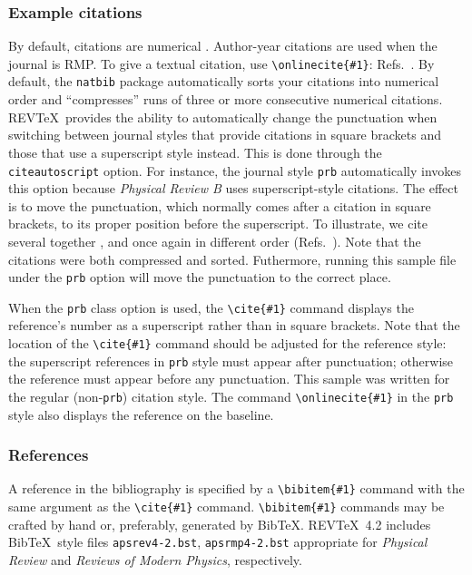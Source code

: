 \documentclass[%
 preprint, linenumbers,
 amsmath,amssymb,
 aps, physrev,
pra,
]{revtex4-2}
\begin{document}
\subsubsection{Example citations}
By default, citations are numerical \cite{Beutler1994}.
Author-year citations are used when the journal is RMP. 
To give a textual citation, use \verb+\onlinecite{#1}+: 
Refs.~. 
By default, the \texttt{natbib} package automatically sorts your citations into numerical order and ``compresses'' runs of three or more consecutive numerical citations.
REV\TeX\ provides the ability to automatically change the punctuation when switching between journal styles that provide citations in square brackets and those that use a superscript style instead. This is done through the \texttt{citeautoscript} option. For instance, the journal style \texttt{prb} automatically invokes this option because \textit{Physical 
Review B} uses superscript-style citations. The effect is to move the punctuation, which normally comes after a citation in square brackets, to its proper position before the superscript. 
To illustrate, we cite several together 
\cite{[See the explanation of time travel in ]feyn54,*[The classical relativistic treatment of ][ is a relative classic]epr,witten2001,Berman1983,Davies1998,Bire82}, 
and once again in different order (Refs.~\cite{epr,feyn54,Bire82,Berman1983,witten2001,Davies1998}). 
Note that the citations were both compressed and sorted. Futhermore, running this sample file under the \texttt{prb} option will move the punctuation to the correct place.

When the \verb+prb+ class option is used, the \verb+\cite{#1}+ command
displays the reference's number as a superscript rather than in
square brackets. Note that the location of the \verb+\cite{#1}+
command should be adjusted for the reference style: the superscript
references in \verb+prb+ style must appear after punctuation;
otherwise the reference must appear before any punctuation. This
sample was written for the regular (non-\texttt{prb}) citation style.
The command \verb+\onlinecite{#1}+ in the \texttt{prb} style also
displays the reference on the baseline.

\subsubsection{References}
A reference in the bibliography is specified by a \verb+\bibitem{#1}+ command
with the same argument as the \verb+\cite{#1}+ command.
\verb+\bibitem{#1}+ commands may be crafted by hand or, preferably,
generated by Bib\TeX. 
REV\TeX~4.2 includes Bib\TeX\ style files
\verb+apsrev4-2.bst+, \verb+apsrmp4-2.bst+ appropriate for
\textit{Physical Review} and \textit{Reviews of Modern Physics},
respectively.
\end{document}
